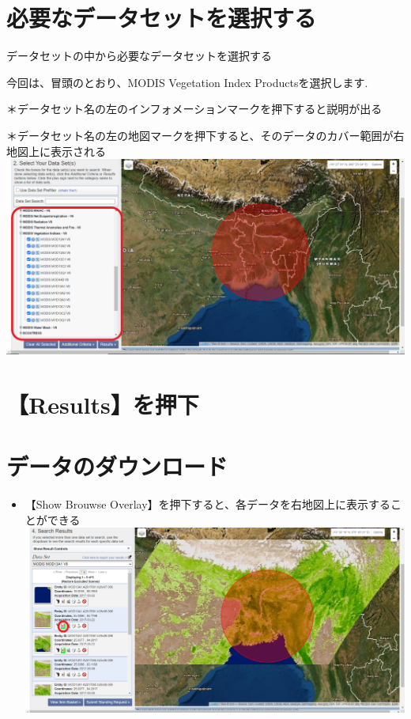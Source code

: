 \documentclass[
]{book}
\providecommand{\tightlist}{%
  \setlength{\itemsep}{0pt}\setlength{\parskip}{0pt}}
\begin{document}
\hypertarget{ux5fc5ux8981ux306aux30c7ux30fcux30bfux30bbux30c3ux30c8ux3092ux9078ux629eux3059ux308b}{%
\section{必要なデータセットを選択する}\label{ux5fc5ux8981ux306aux30c7ux30fcux30bfux30bbux30c3ux30c8ux3092ux9078ux629eux3059ux308b}}

データセットの中から必要なデータセットを選択する

今回は、冒頭のとおり、MODIS Vegetation Index Productsを選択します.

＊データセット名の左のインフォメーションマークを押下すると説明が出る

＊データセット名の左の地図マークを押下すると、そのデータのカバー範囲が右地図上に表示される\\
\includegraphics{images/datasets.png}

\hypertarget{resultsux3092ux62bcux4e0b}{%
\section{【Results】を押下}\label{resultsux3092ux62bcux4e0b}}

\hypertarget{ux30c7ux30fcux30bfux306eux30c0ux30a6ux30f3ux30edux30fcux30c9}{%
\section{データのダウンロード}\label{ux30c7ux30fcux30bfux306eux30c0ux30a6ux30f3ux30edux30fcux30c9}}

\begin{itemize}
\tightlist
\item
  【Show Brouwse Overlay】を押下すると、各データを右地図上に表示することができる
  \includegraphics{images/overray.png}
\end{itemize}
\end{document}
